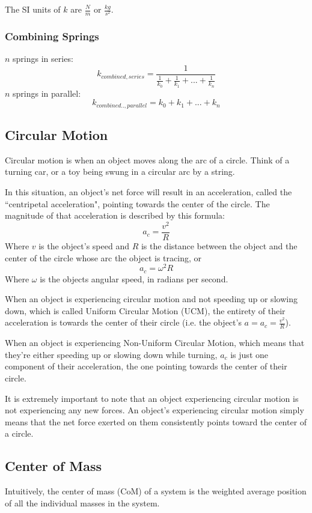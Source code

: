 \documentclass{article}
\begin{document}
The SI units of $k$ are $\frac{N}{m}$ or $\frac{kg}{s^2}$.

\subsubsection{Combining Springs}
$n$ springs in series: $$k_{combined,series} = \frac{1}{\frac{1}{k_0}+\frac{1}{k_1}+...+\frac{1}{k_n}}$$
$n$ springs in parallel: $$k_{combined..,parallel} = k_0+k_1+...+k_n$$

\subsection{Circular Motion}
Circular motion is when an object moves along the arc of a circle. Think of a turning car, or a toy being swung in a circular arc by a string.

In this situation, an object's net force will result in an acceleration, called the ``centripetal acceleration", pointing towards the center of the circle. The magnitude of that acceleration is described by this formula:
$$a_c=\frac{v^2}{R}$$
Where $v$ is the object's speed and $R$ is the distance between the object and the center of the circle whose arc the object is tracing, or
$$a_c=\omega^2 R$$
Where $\omega$ is the objects angular speed, in radians per second.

When an object is experiencing circular motion and not speeding up or slowing down, which is called Uniform Circular Motion (UCM), the entirety of their acceleration is towards the center of their circle
(i.e. the object's $a = a_c = \frac{v^2}{R}$).

When an object is experiencing Non-Uniform Circular Motion, which means that they're either speeding up or slowing down while turning, $a_c$ is just one component of their acceleration, the one pointing towards the center
of their circle.

It is extremely important to note that an object experiencing circular motion is not experiencing any new forces. An object's experiencing circular motion simply means that the net force exerted on them consistently points
toward the center of a circle.

\subsection{Center of Mass}
Intuitively, the center of mass (CoM) of a system is the weighted average position of all the individual masses in the system. 
\end{document}

